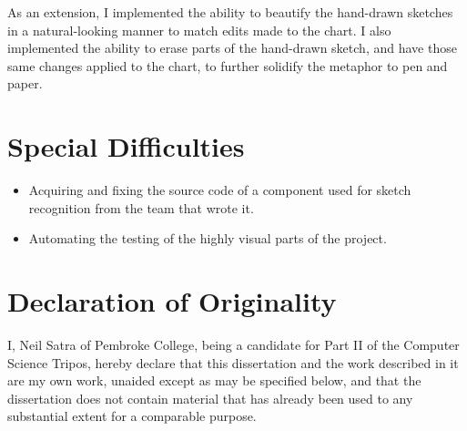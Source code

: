 As an extension, I implemented the ability to beautify the hand-drawn sketches in a natural-looking manner to match edits made to the chart. I also implemented the ability to erase parts of the hand-drawn sketch, and have those same changes applied to the chart, to further solidify the metaphor to pen and paper.

\section*{Special Difficulties}
\begin{itemize}
	\item Acquiring and fixing the source code of a component used for sketch recognition from the team that wrote it.
	\item Automating the testing of the highly visual parts of the project.
\end{itemize}


\section*{Declaration of Originality}

I, Neil Satra of Pembroke College, being a candidate for Part II of the Computer Science Tripos, hereby declare that this dissertation and the work described in it are my own work, unaided except as may be specified below, and that the dissertation does not contain material that has already been used to any substantial extent for a comparable purpose.

\bigskip
{}

\medskip
{}


\clearpage